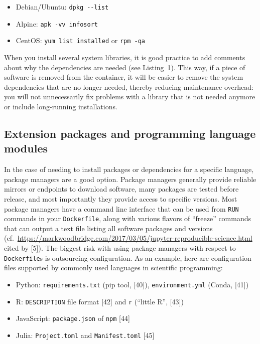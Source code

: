 \documentclass[10pt,letterpaper]{article}
\providecommand{\tightlist}{%
  \setlength{\itemsep}{0pt}\setlength{\parskip}{0pt}}
\begin{document}
\begin{itemize}
\tightlist
\item
  Debian/Ubuntu: \texttt{dpkg\ -\/-list}
\item
  Alpine: \texttt{apk\ -vv\ info\textbar{}sort}
\item
  CentOS: \texttt{yum\ list\ installed} or \texttt{rpm\ -qa}
\end{itemize}

When you install several system libraries, it is good practice to add
comments about why the dependencies are needed (see Listing~1). This
way, if a piece of software is removed from the container, it will be
easier to remove the system dependencies that are no longer needed,
thereby reducing maintenance overhead: you will not unnecessarily fix
problems with a library that is not needed anymore or include
long-running installations.

\hypertarget{extension-packages-and-programming-language-modules}{%
\subsection{Extension packages and programming language
modules}\label{extension-packages-and-programming-language-modules}}

In the case of needing to install packages or dependencies for a
specific language, package managers are a good option. Package managers
generally provide reliable mirrors or endpoints to download software,
many packages are tested before release, and most importantly they
provide access to specific versions. Most package managers have a
command line interface that can be used from \texttt{RUN} commands in
your \texttt{Dockerfile}, along with various flavors of ``freeze''
commands that can output a text file listing all software packages and
versions
(cf.~\url{https://markwoodbridge.com/2017/03/05/jupyter-reproducible-science.html}
cited by {[}5{]}). The biggest risk with using package managers with
respect to \texttt{Dockerfile}s is outsourcing configuration. As an
example, here are configuration files supported by commonly used
languages in scientific programming:

\begin{itemize}
\tightlist
\item
  Python: \texttt{requirements.txt} (pip tool, {[}40{]}),
  \texttt{environment.yml} (Conda, {[}41{]})
\item
  R: \texttt{DESCRIPTION} file format {[}42{]} and \texttt{r} (``little
  R'', {[}43{]})
\item
  JavaScript: \texttt{package.json} of \texttt{npm} {[}44{]}
\item
  Julia: \texttt{Project.toml} and \texttt{Manifest.toml} {[}45{]}
\end{itemize}
\end{document}
